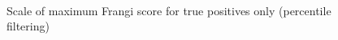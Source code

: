 \begin{figure}[p]\centering
  \\[-0.5cm]
  \caption{Scale of maximum Frangi score for true positives only (percentile filtering)}
\end{figure}
